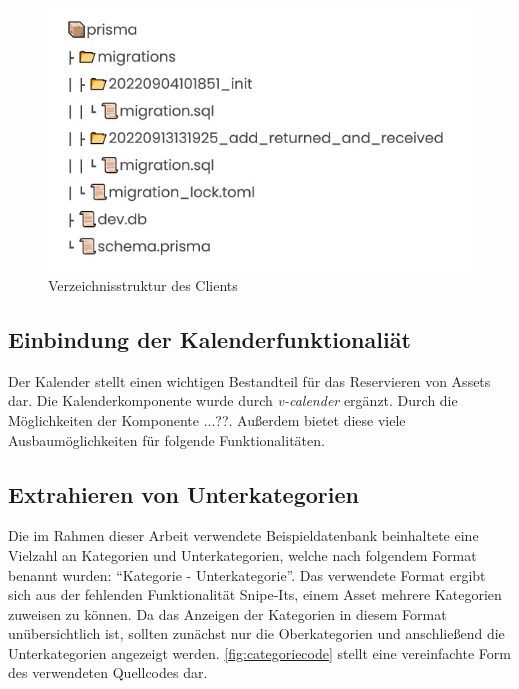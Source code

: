 \begin{figure}[h]
  \centering
  \includegraphics[scale=0.7]{Bilder/Db.jpg}
  \caption[Verzeichnisstruktur des Clients]{Verzeichnisstruktur des Clients}
  \label{fig:vue}
\end{figure}

\subsection{Einbindung der Kalenderfunktionaliät}
Der Kalender stellt einen wichtigen Bestandteil für das Reservieren von Assets dar. Die
Kalenderkomponente wurde durch \textit{v-calender} ergänzt. Durch die Möglichkeiten der Komponente
...??. Außerdem bietet diese viele Ausbaumöglichkeiten für folgende Funktionalitäten.

\subsection{Extrahieren von Unterkategorien}
Die im Rahmen dieser Arbeit verwendete Beispieldatenbank beinhaltete eine Vielzahl an Kategorien und
Unterkategorien, welche nach folgendem Format benannt wurden: \enquote{Kategorie - Unterkategorie}.
Das verwendete Format ergibt sich aus der fehlenden Funktionalität Snipe-Its, einem Asset mehrere
Kategorien zuweisen zu können. Da das Anzeigen der Kategorien in diesem Format unübersichtlich ist,
sollten zunächst nur die Oberkategorien und anschließend die Unterkategorien angezeigt werden.
\ref{fig:categoriecode} stellt eine vereinfachte Form des verwendeten Quellcodes dar. 

